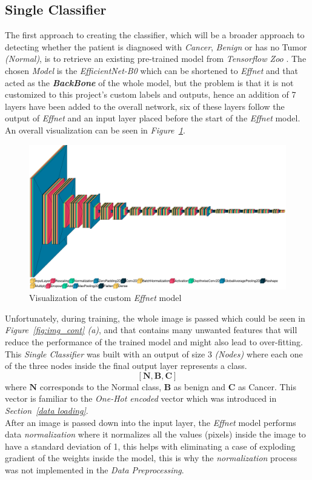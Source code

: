 \documentclass[12pt]{extarticle}
\begin{document}
	\subsection{Single Classifier}\label{single}
	The first approach to creating the classifier, which will be a broader approach to detecting whether the patient is diagnosed with \emph{Cancer}, \emph{Benign} or has no Tumor \emph{(Normal)}, is to retrieve an existing pre-trained model from \emph{Tensorflow Zoo} \cite{tensorflow2015-whitepaper}. The chosen \emph{Model} is the \emph{EfficientNet-B0} which can be shortened to \emph{Effnet} and that acted as the \textbf{\textit{BackBone}} of the whole model, but the problem is that it is not customized to this project's custom labels and outputs, hence an addition of 7 layers have been added to the overall network, six of these layers follow the output of \emph{Effnet} and an input layer placed before the start of the \emph{Effnet} model. An overall visualization can be seen in \emph{Figure~\ref{fig:single}}.
	\begin{figure}[h]
		\centering
		\includegraphics[width=1\textwidth]{pics/Figures/effnet_model_out.png}
		\caption{\small{Visualization of the custom \emph{Effnet} model}}
		\label{fig:single}
	\end{figure}
	Unfortunately, during training, the whole image is passed which could be seen in \emph{Figure~\ref{fig:img_cont} (a)}, and that contains many unwanted features that will reduce the performance of the trained model and might also lead to over-fitting.\\
	This \emph{Single Classifier} was built with an output of size 3 \emph{(Nodes)} where each one of the three nodes inside the final output layer represents a class.
	\begin{equation}
		\bm{[N, B, C]}
	\end{equation}
	where $\bm{N}$ corresponds to the Normal class, $\bm{B}$ as benign and $\bm{C}$ as Cancer. This vector is familiar to the \emph{One-Hot encoded} vector which was introduced in \emph{Section~\ref{data loading}}.\\
	After an image is passed down into the input layer, the \emph{Effnet} model performs data \emph{normalization} where it normalizes all the values (pixels) inside the image to have a standard deviation of 1, this helps with eliminating a case of exploding gradient of the weights inside the model, this is why the \emph{normalization} process was not implemented in the \emph{Data Preprocessing}.
	
\end{document}
